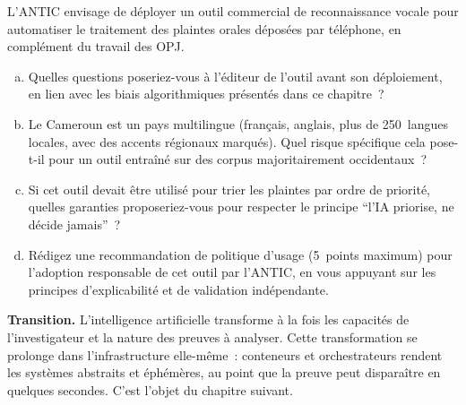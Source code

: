 \begin{boxexo}[title={\ding{45}\quad Exercice~23.3. IA et biais en contexte camerounais \niveauexpert}]
L'ANTIC envisage de déployer un outil commercial de reconnaissance
vocale pour automatiser le traitement des plaintes orales déposées
par téléphone, en complément du travail des OPJ.
\begin{enumerate}[(a)]
    \item Quelles questions poseriez-vous à l'éditeur de l'outil
          avant son déploiement, en lien avec les biais algorithmiques
          présentés dans ce chapitre~?
    \item Le Cameroun est un pays multilingue (français, anglais,
          plus de 250~langues locales, avec des accents régionaux
          marqués). Quel risque spécifique cela pose-t-il pour
          un outil entraîné sur des corpus majoritairement
          occidentaux~?
    \item Si cet outil devait être utilisé pour trier les plaintes
          par ordre de priorité, quelles garanties proposeriez-vous
          pour respecter le principe ``l'IA priorise, ne décide
          jamais''~?
    \item Rédigez une recommandation de politique d'usage (5~points
          maximum) pour l'adoption responsable de cet outil par
          l'ANTIC, en vous appuyant sur les principes
          d'explicabilité et de validation indépendante.
\end{enumerate}
\end{boxexo}

\bigskip

\begin{boxinfo}
\textbf{Transition.} L'intelligence artificielle transforme à la
fois les capacités de l'investigateur et la nature des preuves
à analyser. Cette transformation se prolonge dans l'infrastructure
elle-même~: conteneurs et orchestrateurs rendent les systèmes
abstraits et éphémères, au point que la preuve peut disparaître
en quelques secondes. C'est l'objet du chapitre suivant.
\end{boxinfo}